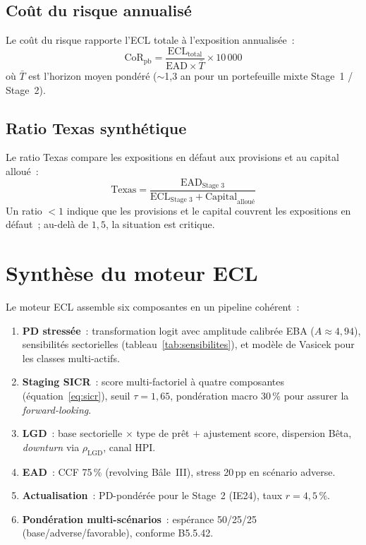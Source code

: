\documentclass[12pt, a4paper, twoside, openright]{report}
\theoremstyle{definition}
\begin{document}
\subsection{Coût du risque annualisé}

Le coût du risque rapporte l'ECL totale à l'exposition annualisée~:
\begin{equation}
\text{CoR}_{\text{pb}} = \frac{\text{ECL}_{\text{total}}}{\text{EAD} \times \bar{T}} \times 10\,000
\label{eq:cor}
\end{equation}
où $\bar{T}$ est l'horizon moyen pondéré ($\sim$1{,}3 an pour un portefeuille mixte Stage~1 / Stage~2).

\subsection{Ratio Texas synthétique}

Le ratio Texas compare les expositions en défaut aux provisions et au capital alloué~:
\begin{equation}
\text{Texas} = \frac{\text{EAD}_{\text{Stage 3}}}{\text{ECL}_{\text{Stage 3}} + \text{Capital}_{\text{alloué}}}
\label{eq:texas}
\end{equation}
Un ratio $< 1$ indique que les provisions et le capital couvrent les expositions en défaut~; au-delà de $1{,}5$, la situation est critique.

\section{Synthèse du moteur ECL}
\label{sec:ecl:synthese}

Le moteur ECL assemble six composantes en un pipeline cohérent~:

\begin{enumerate}
  \item \textbf{PD stressée}~: transformation logit avec amplitude calibrée EBA ($A \approx 4{,}94$), sensibilités sectorielles (tableau~\ref{tab:sensibilites}), et modèle de Vasicek pour les classes multi-actifs.

  \item \textbf{Staging SICR}~: score multi-factoriel à quatre composantes (équation~\ref{eq:sicr}), seuil $\tau = 1{,}65$, pondération macro 30\,\% pour assurer la \emph{forward-looking}.

  \item \textbf{LGD}~: base sectorielle $\times$ type de prêt $+$ ajustement score, dispersion Bêta, \emph{downturn} via $\rho_{\text{LGD}}$, canal HPI.

  \item \textbf{EAD}~: CCF 75\,\% (revolving Bâle~III), stress 20\,pp en scénario adverse.

  \item \textbf{Actualisation}~: PD-pondérée pour le Stage~2 (IE24), taux $r = 4{,}5\,\%$.

  \item \textbf{Pondération multi-scénarios}~: espérance 50/25/25 (base/adverse/favorable), conforme B5.5.42.
\end{enumerate}
\end{document}
